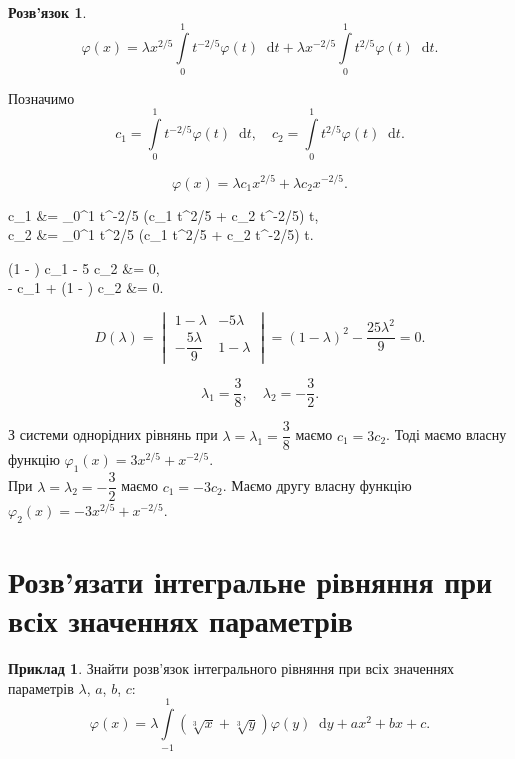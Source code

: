 \documentclass[a4paper, 12pt]{article}
\theoremstyle{definition}
\newtheorem*{example*}{Приклад}
\newtheorem*{solution*}{Розв'язок}
\newcommand{\Int}{\displaystyle\int\limits}
\newcommand*\diff{\mathop{}\!\mathrm{d}}
\renewcommand{\phi}{\varphi}
\newenvironment{system*}{\begin{equation*} \left\{\begin{aligned}}{\end{aligned} \right. \end{equation*}}
\begin{document}
\begin{solution*}
	\[ \phi(x) = \lambda x^{2 / 5} \Int_0^1 t^{-2/5} \phi(t) \diff t + \lambda x^{-2/5} \Int_0^1 t^{2/5} \phi(t) \diff t. \]

	Позначимо \[ c_1 = \Int_0^1 t^{-2/5} \phi(t) \diff t, \quad c_2 = \Int_0^1 t^{2/5} \phi(t) \diff t. \]

	\[ \phi(x) = \lambda c_1 x^{2/5} + \lambda c_2 x^{-2/5}. \]
	
	\begin{system*}
		c_1 &= \Int_0^1 t^{-2/5} (\lambda c_1 t^{2/5} + \lambda c_2 t^{-2/5}) \diff t, \\
		c_2 &= \Int_0^1 t^{2/5} (\lambda c_1 t^{2/5} + \lambda c_2 t^{-2/5}) \diff t.
	\end{system*}
	
	\begin{system*}
		(1 - \lambda) c_1 - 5 \lambda c_2 &= 0, \\
		- c_1 + (1 - \lambda) c_2 &= 0.
	\end{system*}
	
	\[ D(\lambda) = \begin{vmatrix} 1 - \lambda & - 5 \lambda \\ - \dfrac{5\lambda}{9} & 1 - \lambda \end{vmatrix} = (1 - \lambda)^2 - \dfrac{25\lambda^2}{9} = 0. \]
	
	\[ \lambda_1 = \dfrac{3}{8}, \quad \lambda_2 = - \dfrac{3}{2}. \]
	
	З системи однорідних рівнянь при $\lambda = \lambda_1 = \dfrac{3}{8}$ маємо $c_1 = 3 c_2$. Тоді маємо власну функцію $\phi_1(x) = 3 x^{2 / 5} + x^{-2 / 5}$. \\

	При $\lambda = \lambda_2 = - \dfrac{3}{2}$ маємо $c_1 = - 3 c_2$. Маємо другу власну функцію $\phi_2(x) = - 3 x^{2 / 5} + x^{-2 / 5}$.
\end{solution*}

\newpage

\section{Розв'язати інтегральне рівняння при всіх значеннях параметрів}

\begin{example*}
	Знайти розв’язок інтегрального рівняння при всіх значеннях параметрів $\lambda$, $a$, $b$, $c$: \[\phi(x) = \lambda \Int_{-1}^1 (\sqrt[3]{x} + \sqrt[3]{y}) \phi(y) \diff y + ax^2 + bx + c. \]
\end{example*}
\end{document}
